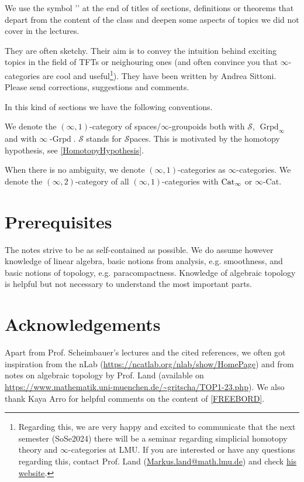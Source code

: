 \begin{notat}[\extra]
    We use the symbol '\extra' at the end of titles of sections, definitions or theorems that depart from the
    content of the class and deepen some aspects of topics we did not cover in the lectures.
    
    They are often sketchy. Their aim is to convey the intuition behind exciting topics in the field of TFTs
     or neighouring ones (and often
    convince you that $\infty$-categories are cool and useful\footnote{Regarding this, we are very 
    happy and excited to communicate that the next semester (SoSe2024) there will be a seminar
    regarding simplicial homotopy theory and $\infty$-categories at LMU. If you are interested or 
    have any questions regarding this, contact Prof. Land
     (\href{mailto:Markus.land@math.lmu.de}{Markus.land@math.lmu.de}) and check
     \href{https://www.markus-land.de}{his website}.}). They have been written by Andrea Sittoni.
    Please send corrections, suggestions and comments.
\end{notat}
In this kind of sections we have the following conventions.
\begin{notat}
We denote the $(\infty,1)$-category of spaces/$\infty$-groupoids both with $\mathscr{S}$,
 $\operatorname{Grpd}_\infty$ and with $\infty\operatorname{-Grpd}$. $\mathscr{S}$ stands for 
 $\mathscr{S}$paces. This is motivated by the
  homotopy hypothesis, see \ref{HomotopyHypothesis}.
\end{notat}
\begin{notat}
When there is no ambiguity, we denote $(\infty,1)$-categories as $\infty$-categories. We denote the
$(\infty,2)$-category of all $(\infty,1)$-categories with $\operatorname{Cat}_\infty$ or $\infty$-Cat.
\end{notat}
\section*{Prerequisites}
The notes strive to be as self-contained as possible. We do assume however knowledge of linear algebra,
basic notions from analysis, e.g. smoothness, and basic notions of topology, e.g. 
paracompactness. Knowledge of algebraic topology is helpful but not necessary to understand the
most important parts.
\section*{Acknowledgements}
Apart from Prof. Scheimbauer's lectures and the cited references,
we often got inspiration from the nLab (\url{https://ncatlab.org/nlab/show/HomePage}) and from notes
on algebraic topology by Prof. Land (available on \url{https://www.mathematik.uni-muenchen.de/~gritscha/TOP1-23.php}).
We also thank Kaya Arro for helpful comments on the content of \ref{FREEBORD}.
\thispagestyle{empty}
\hfill
\vspace{0.50cm}
\textcolor{black}{\tableofcontents}